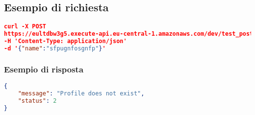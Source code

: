 \subsection{Esempio di richiesta}
\begin{lstlisting}[language=json]
curl -X POST 
https://eultdbw3g5.execute-api.eu-central-1.amazonaws.com/dev/test_post
-H 'Content-Type: application/json'
-d '{"name":"sfpugnfosgnfp"}'
\end{lstlisting}

\subsubsection{Esempio di risposta}
\begin{lstlisting}[language=json]
{
    "message": "Profile does not exist",
    "status": 2
}
\end{lstlisting}

